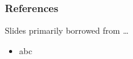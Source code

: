 \begin{frame}[fragile]\frametitle{References}
Slides primarily borrowed from \ldots

\begin{itemize}
\item abc
\end{itemize}

\end{frame}
